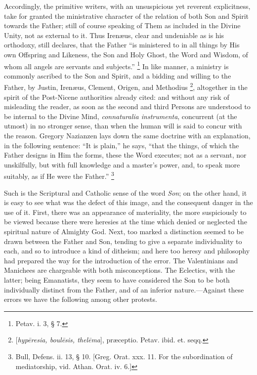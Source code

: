 Accordingly, the primitive writers, with an unsuspicious yet
reverent explicitness, take for granted the ministrative character of
the relation of both Son and Spirit towards the Father; still of
course speaking of Them as included in the Divine Unity, not as
external to it. Thus Irenæus, clear and undeniable as is his
orthodoxy, still declares, that the Father ``is ministered to in
all things by His own Offspring and Likeness, the Son and Holy Ghost,
the Word and Wisdom, of whom all angels are servants and
subjects.'' \footnote{Petav. i. 3, § 7.} In
like manner, a ministry is commonly ascribed to the Son and Spirit,
and a bidding and willing to the Father, by Justin, Irenæus, Clement,
Origen, and Methodius \footnote{[\emph{hyp\={e}resia, boul\={e}sis,
thel\={e}ma}], præceptio. Petav. ibid. et. seqq.},
altogether in the spirit of the Post-Nicene authorities already cited:
and without any risk of misleading the reader, as soon as the second
and third Persons are understood to be internal to the Divine Mind, \emph{connaturalia
instrumenta}, concurrent (at the utmost) in no stronger sense, than
when the human will is said to concur with the reason. Gregory
Nazianzen lays down the same doctrine with an explanation, in the
following sentence: ``It is plain,'' he says, ``that the
things, of which the Father designs in Him the forms, these the Word
executes; not as a servant, nor unskilfully, but with full knowledge
and a master's power, and, to speak more suitably, as if He were
the Father.'' \footnote{Bull, Defens. ii. 13, § 10. [Greg. Orat.
xxx. 11. For the subordination of mediatorship, vid. Athan. Orat. iv.
6.]}

Such is the Scriptural and Catholic sense of the word \emph{Son};
on the other hand, it is easy to see what was the defect of this
image, and the consequent danger in the use of it. First, there was an
appearance of materiality, the more suspiciously to be viewed because
there were heresies at the time which denied or neglected the
spiritual nature of Almighty God. Next, too marked a distinction
seemed to be drawn between the Father and Son, tending to give a
separate individuality to each, and so to introduce a kind of
ditheism; and here too heresy and philosophy had prepared the way for
the introduction of the error. The Valentinians and Manichees are
chargeable with both misconceptions. The Eclectics, with the latter;
being Emanatists, they seem to have considered the Son to be both
individually distinct from the Father, and of an inferior nature.—Against
these errors we have the following among other protests.

